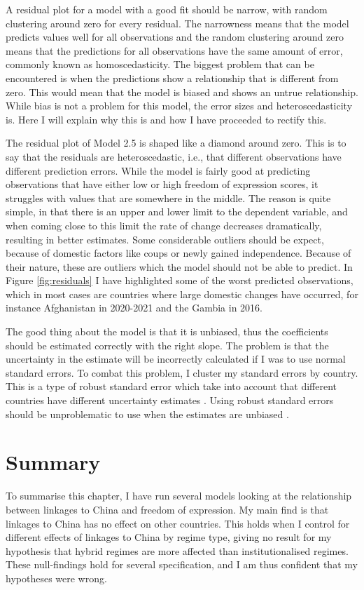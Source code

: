 A residual plot for a model with a good fit should be narrow, with random clustering around zero for every residual. The narrowness means that the model predicts values well for all observations and the random clustering around zero means that the predictions for all observations have the same amount of error, commonly known as homoscedasticity. The biggest problem that can be encountered is when the predictions show a relationship that is different from zero. This would mean that the model is biased and shows an untrue relationship. While bias is not a problem for this model, the error sizes and heteroscedasticity is. Here I will explain why this is and how I have proceeded to rectify this. 

The residual plot of Model 2.5 is shaped like a diamond around zero. This is to say that the residuals are heteroscedastic, i.e., that different observations have different prediction errors. While the model is fairly good at predicting observations that have either low or high freedom of expression scores, it struggles with values that are somewhere in the middle. The reason is quite simple, in that there is an upper and lower limit to the dependent variable, and when coming close to this limit the rate of change decreases dramatically, resulting in better estimates. Some considerable outliers should be expect, because of domestic factors like coups or newly gained independence. Because of their nature, these are outliers which the model should not be able to predict. In Figure \ref{fig:residuals} I have highlighted some of the worst predicted observations, which in most cases are countries where large domestic changes have occurred, for instance Afghanistan in 2020-2021 and the Gambia in 2016. 

The good thing about the model is that it is unbiased, thus the coefficients should be estimated correctly with the right slope. The problem is that the uncertainty in the estimate will be incorrectly calculated if I was to use normal standard errors. To combat this problem, I cluster my standard errors by country. This is a type of robust standard error which take into account that different countries have different uncertainty estimates \citep{moulton_random_1986, huntington-klein_effect_2022}. Using robust standard errors should be unproblematic to use when the estimates are unbiased \citep[p. 60]{wooldridge_econometric_2010}.

\section{Summary}
To summarise this chapter, I have run several models looking at the relationship between linkages to China and freedom of expression. My main find is that linkages to China has no effect on other countries. This holds when I control for different effects of linkages to China by regime type, giving no result for my hypothesis that hybrid regimes are more affected than institutionalised regimes. These null-findings hold for several specification, and I am thus confident that my hypotheses were wrong. 
